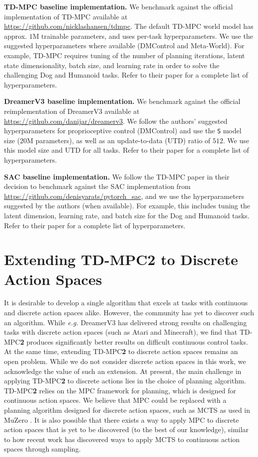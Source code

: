 \documentclass{article}
\begin{document}
\textbf{TD-MPC baseline implementation.} We benchmark against the official implementation of TD-MPC available at \url{https://github.com/nicklashansen/tdmpc}. The default TD-MPC world model has approx. $1$M trainable parameters, and uses per-task hyperparameters. We use the suggested hyperparameters where available (DMControl and Meta-World). For example, TD-MPC requires tuning of the number of planning iterations, latent state dimensionality, batch size, and learning rate in order to solve the challenging Dog and Humanoid tasks. Refer to their paper for a complete list of hyperparameters.

\textbf{DreamerV3 baseline implementation.} We benchmark against the official reimplementation of DreamerV3 available at \url{https://github.com/danijar/dreamerv3}. We follow the authors' suggested hyperparameters for proprioceptive control (DMControl) and use the \texttt{S} model size ($20$M parameters), as well as an update-to-data (UTD) ratio of $512$. We use this model size and UTD for all tasks. Refer to their paper for a complete list of hyperparameters.

\textbf{SAC baseline implementation.} We follow the TD-MPC \citep{Hansen2022tdmpc} paper in their decision to benchmark against the SAC implementation from \url{https://github.com/denisyarats/pytorch_sac}, and we use the hyperparameters suggested by the authors (when available). For example, this includes tuning the latent dimension, learning rate, and batch size for the Dog and Humanoid tasks. Refer to their paper for a complete list of hyperparameters.


\section{Extending TD-MPC\textcolor{nhred}{\textbf{2}} to Discrete Action Spaces}
\label{sec:appendix-discrete-actions}
It is desirable to develop a single algorithm that excels at tasks with continuous and discrete action spaces alike. However, the community has yet to discover such an algorithm. While \emph{e.g.} DreamerV3 \citep{hafner2023dreamerv3} has delivered strong results on challenging tasks with discrete action spaces (such as Atari and Minecraft), we find that TD-MPC\textbf{2} produces significantly better results on difficult continuous control tasks. At the same time, extending TD-MPC\textbf{2} to discrete action spaces remains an open problem. While we do not consider discrete action spaces in this work, we acknowledge the value of such an extension. At present, the main challenge in applying TD-MPC\textbf{2} to discrete actions lies in the choice of planning algorithm. TD-MPC\textbf{2} relies on the MPC framework for planning, which is designed for continuous action spaces. We believe that MPC could be replaced with a planning algorithm designed for discrete action spaces, such as MCTS \citep{Coulom2007MCTS} as used in MuZero \citep{schrittwieser2020mastering}. It is also possible that there exists a way to apply MPC to discrete action spaces that is yet to be discovered (to the best of our knowledge), similar to how recent work \citep{hubert2021learning} has discovered ways to apply MCTS to continuous action spaces through sampling.
\end{document}

